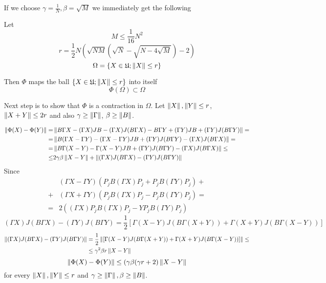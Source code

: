 \documentclass{article}
\begin{document}
If we choose \( \gamma=\frac{1}{N}, \beta=\sqrt{M} \) we immediately get the following
\begin{thm}\label{thm:endo_nm}
    Let
    \begin{equation}\label{eq:phi_endo_nm_condition}
        M \leq \frac{1}{16} N^2
    \end{equation}
    \begin{equation}\label{eq:phi_endo_nm_radia}
        r = \frac12 N
        \left(
        \sqrt{NM}(\sqrt{N} - \sqrt{N-4\sqrt{M}}) - 2
        \right)
    \end{equation}
    \[\Omega = \{ X\in\mathfrak U; \left\|{X}\right\| \leq r \}\]

    Then
    \( \Phi \) maps the ball \( \{ X\in\mathfrak U; \left\|{X}\right\| \leq r \} \) into itself
    \[\Phi(\Omega)\subset\Omega\]
\end{thm}

Next step is to show that \( \Phi \) is a contraction in \( \Omega \).
Let \( \left\|{X}\right\|, \left\|{Y}\right\| \leq r \), \( \left\|{X+Y}\right\| \leq 2r \) and also \( \gamma\geq\left\|{\Gamma}\right\| \), \( \beta\geq\left\|{B}\right\| \).

\begin{align*}
    \left\|{\Phi(X) - \Phi(Y)}\right\|
    =& \left\|{B\Gamma X - (\Gamma X)JB - (\Gamma X)J(B\Gamma X) - B\Gamma Y + (\Gamma Y)JB + (\Gamma Y)J(B\Gamma Y)}\right\| = \\
    =& \left\|{B(\Gamma X - \Gamma Y) - (\Gamma X - \Gamma Y) JB + (\Gamma Y) J(B\Gamma Y) - (\Gamma X)J(B\Gamma X)}\right\| = \\
    =& \left\|{B\Gamma(X-Y) - \Gamma(X-Y)JB + (\Gamma Y) J(B\Gamma Y) - (\Gamma X)J(B\Gamma X)}\right\| \leq \\
    \leq& 2\gamma\beta\left\|{X-Y}\right\| + \left\|{(\Gamma X)J(B\Gamma X) - (\Gamma Y) J(B\Gamma Y)}\right\|
\end{align*}
Since 
\begin{align*}
    &(\Gamma X - \Gamma Y)(P_jB(\Gamma X)P_j + P_jB(\Gamma Y)P_j) + \\
    + &(\Gamma X + \Gamma Y)(P_jB(\Gamma X)P_j - P_jB(\Gamma Y)P_j) = \\
= &2((\Gamma X)P_jB(\Gamma X)P_j- YP_jB(\Gamma Y)P_j)\end{align*}
\[(\Gamma X)J(B\Gamma X) - (\Gamma Y) J(B\Gamma Y)
= \frac12\left[\Gamma(X-Y)J(B\Gamma(X+Y)) + \Gamma(X+Y)J(B\Gamma(X-Y))\right]\]
\begin{align*}
    \left\|{(\Gamma X)J(B\Gamma X) - (\Gamma Y) J(B\Gamma Y)}\right\|
    &= \frac12\left\|{\left[\Gamma(X-Y)J(B\Gamma(X+Y)) + \Gamma(X+Y)J(B\Gamma(X-Y))\right]}\right\|\leq \\
    &\leq \gamma^2\beta r \left\|{X-Y}\right\|
\end{align*}
\[\left\|{\Phi(X) - \Phi(Y)}\right\| \leq (\gamma\beta(\gamma r + 2)\left\|{X-Y}\right\|\]
for every \( \left\|{X}\right\|, \left\|{Y}\right\| \leq r \) and \( \gamma\geq\left\|{\Gamma}\right\|, \beta\geq\left\|{B}\right\| \).
\end{document}
